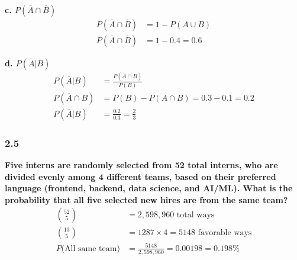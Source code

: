 \documentclass[
	a4paper, %
	10pt, %
	unnumberedsections, %
	twoside, %
]{LTJournalArticle}
\begin{document}
\textbf{c. $P(\overline A \cap \overline B)$}
\begin{equation*}
    \begin{aligned}
        P(\overline A \cap \overline B) &= 1 - P(A \cup B) \\
        P(\overline A \cap \overline B) &= 1 - 0.4 = 0.6
    \end{aligned}
\end{equation*}


\textbf{d. $P(\overline A | B)$} \\
\begin{equation*}
    \begin{aligned}
        P(\overline A | B) &= \frac{P(\overline{A}\cap B)}{P(B)} \\
        P(\overline A \cap B) &= P(B) - P(A \cap B) = 0.3 - 0.1 = 0.2 \\
        P(\overline A | B) &= \frac{0.2}{0.3} = \frac{2}{3}
    \end{aligned}
\end{equation*}
\vspace*{1pt}\noindent
\subsubsection{2.5}
\textbf{Five interns are randomly selected from 52 total interns, who are divided evenly among 4 different teams, based on their preferred language (frontend, backend, data science, and AI/ML). What is the probability that all five selected new hires are from the same team?} \\
\begin{equation*}
    \begin{aligned}
        \binom{52}{5} &= 2,598,960 \text{ total ways}\\ 
        \binom{13}{5} &= 1287 \times 4 = 5148 \text{ favorable ways} \\
        P(\text{All same team)} &= \frac{5148}{2,598,960} = 0.00198 = 0.198\%
    \end{aligned}
\end{equation*}
\vspace*{1pt}\noindent
\end{document}
